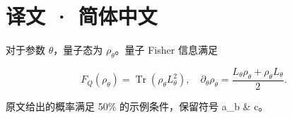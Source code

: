 \documentclass[UTF8,fontset=fandol,11pt]{ctexart}
\begin{document}
\section*{译文 · 简体中文}
对于参数 \(\theta\)，量子态为 \(\rho_\theta\)。量子 Fisher 信息满足
\par
\[F_Q(\rho_\theta)=\operatorname{Tr}(\rho_\theta L_\theta^2),\quad \partial_\theta \rho_\theta=\frac{L_\theta\rho_\theta+\rho_\theta L_\theta}{2}.\]
\par
原文给出的概率满足 50\% 的示例条件，保留符号 a\_b \& c。
\end{document}

